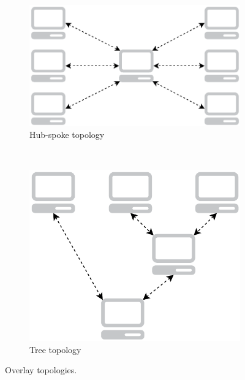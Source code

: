 \begin{figure}[h]
        \centering
        \begin{subfigure}[b]{0.5\textwidth}
                \centering
                \includegraphics[width=\textwidth]{./figures/hubandspoke.pdf}
                \caption{Hub-spoke topology}
                \label{fig:hubandspoke}
        \end{subfigure}%
        ~ %
        \begin{subfigure}[b]{0.5\textwidth}
                \centering
                \includegraphics[width=\textwidth]{./figures/three.pdf}
                \caption{Tree topology}
                \label{fig:three}
        \end{subfigure}
        \caption[Overlay topologies]{Overlay topologies.}
        \label{fig:overlaytopologies}
\end{figure}

